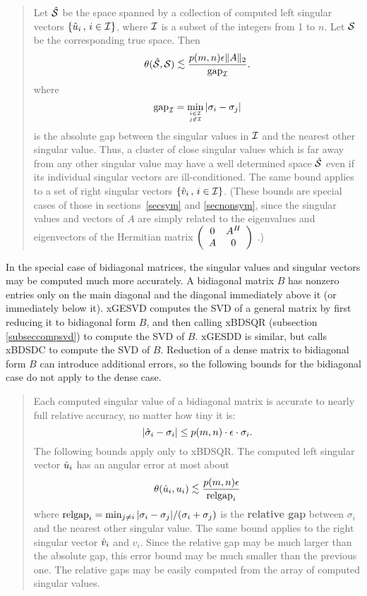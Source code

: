 \begin{quote}
Let $\hatcalS$ be the space spanned by a collection of computed left singular
vectors $\{\hat{u}_i \, , \, i \in {\cal I}\}$, where $\cal I$ is a subset
of the integers from 1 to $n$. Let $\calS$ be the corresponding true space.
Then
\[
\theta ( \hatcalS , \calS ) \leapproxeq \frac{p(m,n) \epsilon \|A\|_2}
{\gap_{\cal I}}  .
\]
where
\[
\gap_{\cal I} = \min_{i \in {\cal I} \atop j \not\in {\cal I}}
| \sigma_i - \sigma_j |
\]
is the absolute gap between the singular values in $\cal I$ and the nearest
other singular value. Thus, a cluster
of close singular values which is
far away from any other singular value may have a well determined
space $\hatcalS$ even if its individual singular vectors are ill-conditioned.
The same bound applies to a set of right singular vectors
$\{\hat{v}_i \, , \, i \in {\cal I}\}$.
 (These bounds are special
cases of those in sections~\ref{secsym} and \ref{secnonsym},
since the singular values
and vectors of $A$ are simply related to the eigenvalues and eigenvectors of
the Hermitian matrix $\bmat{cc} 0 & A^H \\ A & 0 \emat$ \cite[p. 427]{GVL2}.)

\end{quote}

In the special case of bidiagonal matrices, the singular values and
singular vectors may be computed much more accurately. A bidiagonal
matrix $B$ has nonzero entries only on the main diagonal and the diagonal
immediately
above it (or immediately below it). xGESVD computes the SVD of a general
matrix by first reducing it to bidiagonal form $B$, and then calling xBDSQR
(subsection \ref{subseccompsvd})
to compute the SVD of $B$.
xGESDD is similar, but calls xBDSDC to compute the SVD of $B$.
Reduction of a dense matrix to bidiagonal form $B$ can introduce
additional errors, so the following bounds for the bidiagonal case
do not apply to the dense case.

\begin{quote}
Each computed singular value of a bidiagonal matrix
is accurate to nearly full relative accuracy,
no matter how tiny it is:
\[
| \sigmahat_i - \sigma_i | \leq p(m,n) \cdot \epsilon \cdot \sigma_i.
\]
The following bounds apply only to xBDSQR.
The computed left singular vector $\uhat_i$ has an angular error
at most about
\[
\theta ( \uhat_i , u_i ) \leapproxeq \frac{p(m,n) \epsilon}{\relgap_i}
\]
where
$\relgap_i = \min_{j \neq i} | \sigma_i - \sigma_j | / ( \sigma_i + \sigma_j )$
is the {\bf relative gap} between $\sigma_i$ and the nearest other singular
value. The same bound applies to the right singular vector $\vhat_i$ and $v_i$.
Since the relative gap may be much larger than
the absolute gap,
this error bound may be much smaller than the previous one. The relative gaps
may be easily computed from the array of computed singular values.
\end{quote}

